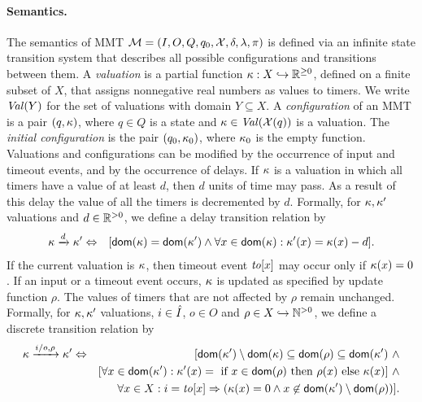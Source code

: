 \paragraph{Semantics.}
The semantics of MMT ${\cal M} = (I, O, Q, q_0, \mathcal{X}, \delta, \lambda, \pi)$ is defined via an infinite state transition system that describes all possible
configurations and transitions between them.
A \emph{valuation} is a partial function
$\kappa : X \hookrightarrow {\mathbb R}^{\geq 0}$, defined on a finite subset of $X$, that assigns nonnegative real numbers as values to timers.
We write $\mathit{Val}({Y})$ for the set of valuations with domain $Y \subseteq X$.
A \emph{configuration} of an MMT is a pair $(q,\kappa)$, where $q \in Q$ is a state and $\kappa\in\mathit{Val}({\mathcal{X}(q)})$ is a valuation.
The \emph{initial configuration} is the pair $(q_0, \kappa_0)$, where $\kappa_0$ is the empty function.
Valuations and configurations can be modified by the occurrence of input and timeout events, and by
the occurrence of delays.
If $\kappa$ is a valuation in which all timers
have a value of at least $d$, then $d$ units of time may pass. As a result of this delay the value of all the timers is decremented by $d$.
Formally, for $\kappa, \kappa'$ valuations and $d \in {\mathbb R}^{> 0}$, we define a delay transition relation by
\begin{eqnarray*}
\kappa \xrightarrow{d} \kappa' & \Leftrightarrow & [{\textsf{dom}}(\kappa) = {\textsf{dom}}(\kappa') \wedge \forall x \in{\textsf{dom}}(\kappa) : \kappa'(x) = \kappa(x) - d ].
\end{eqnarray*}
If the current valuation is $\kappa$, then timeout event $\mathit{to}[x]$ may occur only if $\kappa(x)=0$.
If an input or a timeout event occurs, $\kappa$ is updated as specified by update function $\rho$.
The values of timers that are not affected by $\rho$ remain unchanged.
Formally, for $\kappa, \kappa'$ valuations, $i \in \hat{I}$, $o \in O$ and $\rho \in X \hookrightarrow {\mathbb N}^{>0}$,
we define a discrete transition relation by
\begin{eqnarray*}
\kappa \xrightarrow{i/o, \rho}  \kappa' & \Leftrightarrow & [ {\textsf{dom}}(\kappa') \setminus {\textsf{dom}}(\kappa)  \subseteq {\textsf{dom}}(\rho) \subseteq {\textsf{dom}}(\kappa') ~ \wedge\\
&& [\forall x \in{\textsf{dom}}(\kappa') : \kappa'(x) = \mbox{ if } x \in{\textsf{dom}}(\rho) \mbox{ then } \rho(x) \mbox{ else } \kappa(x)] ~ \wedge\\
&& \forall x \in X : i=\mathit{to}[x] \Rightarrow (\kappa(x) = 0 \wedge x \not\in{\textsf{dom}}(\kappa') \setminus {\textsf{dom}}(\rho))].
\end{eqnarray*}
